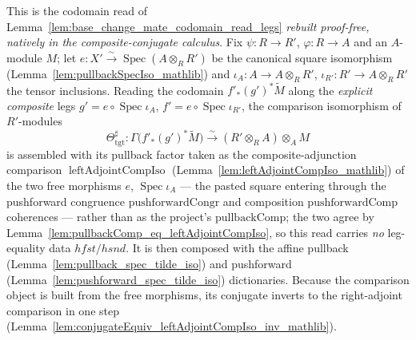 \begin{lemma}

  \label{lem:base_change_mate_codomain_read_legs_conj}
  This is the codomain read of
  Lemma~\ref{lem:base_change_mate_codomain_read_legs} \emph{rebuilt proof-free, natively in the
  composite-conjugate calculus}. Fix \(\psi : R \to R'\), \(\varphi : R \to A\) and an \(A\)-module
  \(M\); let \(e : X' \xrightarrow{\sim} \operatorname{Spec}(A \otimes_R R')\) be the canonical square
  isomorphism (Lemma~\ref{lem:pullbackSpecIso_mathlib}) and \(\iota_A : A \to A \otimes_R R'\),
  \(\iota_{R'} : R' \to A \otimes_R R'\) the tensor inclusions. Reading the codomain
  \(f'_*(g')^*\widetilde M\) along the \emph{explicit composite} legs
  \(g' = e \circ \operatorname{Spec}\iota_A\), \(f' = e \circ \operatorname{Spec}\iota_{R'}\), the
  comparison isomorphism of \(R'\)-modules
  \[
    \Theta_{\mathrm{tgt}}^{\sharp} :
    \Gamma\bigl(f'_*(g')^*\widetilde M\bigr)
    \xrightarrow{\ \sim\ }
    (R' \otimes_R A) \otimes_A M
  \]
  is assembled with its pullback factor taken as the composite-adjunction comparison
  \(\operatorname{leftAdjointCompIso}\) (Lemma~\ref{lem:leftAdjointCompIso_mathlib}) of the two free
  morphisms \(e\), \(\operatorname{Spec}\iota_A\) — the pasted square entering through the pushforward
  congruence \(\mathrm{pushforwardCongr}\) and composition \(\mathrm{pushforwardComp}\) coherences —
  rather than as the project's \(\mathrm{pullbackComp}\); the two agree by
  Lemma~\ref{lem:pullbackComp_eq_leftAdjointCompIso}, so this read carries \emph{no} leg-equality data
  \(\mathit{hfst}/\mathit{hsnd}\). It is then composed with the affine pullback
  (Lemma~\ref{lem:pullback_spec_tilde_iso}) and pushforward (Lemma~\ref{lem:pushforward_spec_tilde_iso})
  dictionaries. Because the comparison object is built from the free morphisms, its conjugate inverts to
  the right-adjoint comparison in one step
  (Lemma~\ref{lem:conjugateEquiv_leftAdjointCompIso_inv_mathlib}).
\end{lemma}

